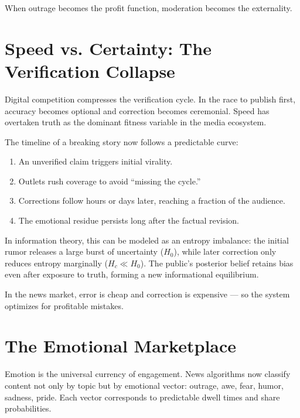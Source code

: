 \documentclass[12pt,twoside]{book}
\begin{document}
\begin{keyidea}
When outrage becomes the profit function, moderation becomes the externality.
\end{keyidea}

\section{Speed vs. Certainty: The Verification Collapse}

Digital competition compresses the verification cycle.  
In the race to publish first, accuracy becomes optional and correction becomes ceremonial.  
Speed has overtaken truth as the dominant fitness variable in the media ecosystem.

The timeline of a breaking story now follows a predictable curve:
\begin{enumerate}
  \item An unverified claim triggers initial virality.  
  \item Outlets rush coverage to avoid “missing the cycle.”  
  \item Corrections follow hours or days later, reaching a fraction of the audience.  
  \item The emotional residue persists long after the factual revision.  
\end{enumerate}

In information theory, this can be modeled as an entropy imbalance: the initial rumor releases a large burst of uncertainty (\(H_0\)), while later correction only reduces entropy marginally (\(H_c \ll H_0\)).  
The public’s posterior belief retains bias even after exposure to truth, forming a new informational equilibrium.  \\

\begin{keyidea}
In the news market, error is cheap and correction is expensive — so the system optimizes for profitable mistakes.
\end{keyidea}

\section{The Emotional Marketplace}

Emotion is the universal currency of engagement.  
News algorithms now classify content not only by topic but by emotional vector: outrage, awe, fear, humor, sadness, pride.  
Each vector corresponds to predictable dwell times and share probabilities.  
\end{document}
